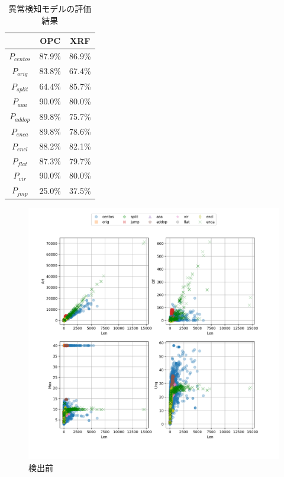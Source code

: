 \documentclass[12pt]{jarticle}
\newcommand\doubleRule{\toprule\toprule}
\begin{document}
\begin{table}[b!]
\centering
\caption{異常検知モデルの評価結果}
\label{table:ocsvmEval}
\begin{tabular}[t]{c|cc}
\doubleRule
& OPC & XRF \\
\hline
$P_{centos}$ & 87.9\% & 86.9\% \\
$P_{orig}$ & 83.8\% & 67.4\% \\
$P_{split}$ & 64.4\% & 85.7\% \\\hline
$P_{aaa}$ & 90.0\% & 80.0\% \\
$P_{addop}$ & 89.8\% & 75.7\% \\
$P_{enca}$ & 89.8\% & 78.6\% \\
$P_{encl}$ & 88.2\% & 82.1\% \\
$P_{flat}$ & 87.3\% & 79.7\% \\
$P_{vir}$ & 90.0\% & 80.0\% \\
$P_{jmp}$ & 25.0\% & 37.5\% \\
\bottomrule
\end{tabular}
\end{table}

\begin{figure}[bhtp]
  \includegraphics[width=17cm]{opc_OCSVM_all_b4.pdf}
  \caption{検出前}
  \label{fig:OCSVM_b4}
\end{figure}
\end{document}

